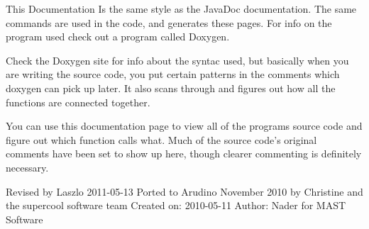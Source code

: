 \begin{DoxyParagraph}{\-This \-Documentation}
\-Is the same style as the \-Java\-Doc documentation. \-The same commands are used in the code, and generates these pages. \-For info on the program used check out a program called \-Doxygen.
\end{DoxyParagraph}
\begin{DoxyParagraph}{}
\-Check the \-Doxygen site for info about the syntac used, but basically when you are writing the source code, you put certain patterns in the comments which doxygen can pick up later. \-It also scans through and figures out how all the functions are connected together.
\end{DoxyParagraph}
\begin{DoxyParagraph}{}
\-You can use this documentation page to view all of the programs source code and figure out which function calls what. \-Much of the source code's original comments have been set to show up here, though clearer commenting is definitely necessary.
\end{DoxyParagraph}
\begin{DoxyParagraph}{\-Revised by \-Laszlo 2011-\/05-\/13}
\-Ported to \-Arudino \-November 2010 by \-Christine and the supercool software team \-Created on\-: 2010-\/05-\/11 \-Author\-: \-Nader for \-M\-A\-S\-T \-Software 
\end{DoxyParagraph}
